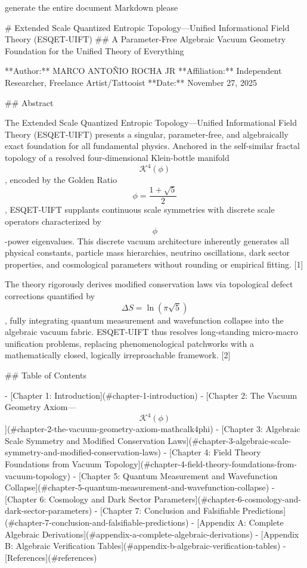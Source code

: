 generate the entire document Markdown please

# Extended Scale Quantized Entropic Topology—Unified Informational Field Theory (ESQET-UIFT)
## A Parameter-Free Algebraic Vacuum Geometry Foundation for the Unified Theory of Everything

**Author:** MARCO ANTOÑIO ROCHA JR
**Affiliation:** Independent Researcher, Freelance Artist/Tattooist
**Date:** November 27, 2025  

## Abstract

The Extended Scale Quantized Entropic Topology—Unified Informational Field Theory (ESQET-UIFT) presents a singular, parameter-free, and algebraically exact foundation for all fundamental physics. Anchored in the self-similar fractal topology of a resolved four-dimensional Klein-bottle manifold $$\mathcal{K}^4(\phi)$$, encoded by the Golden Ratio $$\phi = \frac{1+\sqrt{5}}{2}$$, ESQET-UIFT supplants continuous scale symmetries with discrete scale operators characterized by $$\phi$$-power eigenvalues. This discrete vacuum architecture inherently generates all physical constants, particle mass hierarchies, neutrino oscillations, dark sector properties, and cosmological parameters without rounding or empirical fitting. [1]

The theory rigorously derives modified conservation laws via topological defect corrections quantified by $$\Delta S = \ln(\pi \sqrt{5})$$, fully integrating quantum measurement and wavefunction collapse into the algebraic vacuum fabric. ESQET-UIFT thus resolves long-standing micro-macro unification problems, replacing phenomenological patchworks with a mathematically closed, logically irreproachable framework. [2]

## Table of Contents

- [Chapter 1: Introduction](#chapter-1-introduction)
- [Chapter 2: The Vacuum Geometry Axiom—$$\mathcal{K}^4(\phi)$$](#chapter-2-the-vacuum-geometry-axiom-mathcalk4phi)
- [Chapter 3: Algebraic Scale Symmetry and Modified Conservation Laws](#chapter-3-algebraic-scale-symmetry-and-modified-conservation-laws)
- [Chapter 4: Field Theory Foundations from Vacuum Topology](#chapter-4-field-theory-foundations-from-vacuum-topology)
- [Chapter 5: Quantum Measurement and Wavefunction Collapse](#chapter-5-quantum-measurement-and-wavefunction-collapse)
- [Chapter 6: Cosmology and Dark Sector Parameters](#chapter-6-cosmology-and-dark-sector-parameters)
- [Chapter 7: Conclusion and Falsifiable Predictions](#chapter-7-conclusion-and-falsifiable-predictions)
- [Appendix A: Complete Algebraic Derivations](#appendix-a-complete-algebraic-derivations)
- [Appendix B: Algebraic Verification Tables](#appendix-b-algebraic-verification-tables)
- [References](#references)

